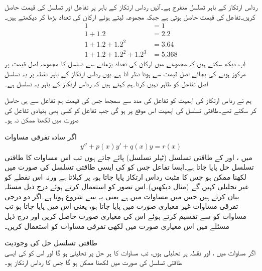 رداس ارتکاز کے باہر تسلسل منفرج ہے۔آئیں رداس ارتکاز کے باہر  پر تفاعل اور تسلسل کی قیمت حاصل کریں۔تفاعل کی قیمت  حاصل ہوتی ہے جبکہ مجموعہ لیتے ہوئے ارکان کی تعداد بڑھا کر دیکھتے ہیں۔ 
\begin{align*}
1&=1 \\
1+1.2&=2.2\\
1+1.2+1.2^2&=3.64\\
1+1.2+1.2^2+1.2^3&=5.368
\end{align*}
آپ دیکھ سکتے ہیں کہ مجموعے میں ارکان کی تعداد بڑھانے سے تسلسل کا مجموعہ اصل قیمت پر مرکوز ہونے کی بجائے اصل قیمت سے  ہوتا نظر آتا ہے۔یوں رداس ارتکاز کے باہر نقطہ  پر یہ تسلسل اصل تفاعل کو ظاہر نہیں کرتا۔ہم کہتے ہیں کہ رداس ارتکاز کے باہر یہ تسلسل  ہے۔

ہم نے رداس ارتکاز کی اہمیت کو تفاعل  کی مدد سے سمجھا جس کی قیمت ہم تفاعل سے ہی حاصل کر سکتے تھے۔طاقتی تسلسل کی اہمیت اس موقع پر ہو گی جب تفاعل کو کسی بھی بنیادی تفاعل کی صورت میں لکھنا ممکن نہ ہو۔


اگر سادہ تفرقی مساوات
\begin{align}\label{مساوات_بیسل_معیاری_تفرقی_مساوات_الف}
y''+p(x)y'+q(x)y=r(x)
\end{align}
میں ،  اور  کے طاقتی تسلسل (ٹیلر تسلسل) پائے جاتے ہوں تب اس مساوات کا طاقتی تسلسل حل پایا جاتا ہے۔ایسا تفاعل  جس کو  کی ایسی طاقتی تسلسل کی صورت میں لکھنا ممکن ہو جس کا مثبت رداس ارتکاز پایا جاتا ہو،  پر  کہلاتا ہے ورنہ اس نقطے کو غیر تحلیلی کہیں گے (مثال  دیکھیں)۔اس تصور کو استعمال کرتے ہوئے درج ذیل مسئلہ بیان کرتے ہیں جس میں مساوات   میں ہے یعنی یہ  سے شروع ہوتا ہے۔اگر دو درجی تفرقی مساوات غیر معیاری صورت میں پایا جاتا ہو، یعنی اس میں  پایا جاتا ہو تب مساوات کو  سے تقسیم کرتے ہوئے اس کی معیاری صورت حاصل کریں اور درج ذیل مسئلے میں اس معیاری صورت میں لکھی تفرقی مساوات کو استعمال کریں۔

\quad طاقتی تسلسل حل کی وجودیت\\
اگر مساوات  میں ،  اور  نقطہ  پر تحلیلی ہوں، تب مساوات  کا ہر حل  پر تحلیلی ہو گا اور اس کو  کی ایسی طاقتی تسلسل کی صورت میں لکھنا ممکن ہو گا جس کا رداس ارتکاز  ہو۔

